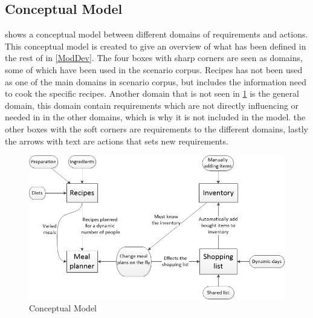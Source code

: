 \subsection{Conceptual Model} \label{ConsMod}
 shows a conceptual model between different domains of requirements and actions. This conceptual model is created to give an overview of what has been defined in the rest of  in \cref{ModDev}. The four boxes with sharp corners are seen as domains, some of which have been used in the scenario corpus. Recipes has not been used as one of the main domains in scenario corpus, but includes the information need to cook the specific recipes. Another domain that is not seen in \cref{ConceptualModelPicture} is the general domain, this domain contain requirements which are not directly influencing or needed in in the other domains, which is why it is not included in the model. the other boxes with the soft corners are requirements to the different domains, lastly the arrows with text are actions that sets new requirements.

\begin{figure}[H]
	\centering
    \includegraphics[width=1\textwidth]{Grafik/conceptualModel}
	\caption{Conceptual Model}
	\label{ConceptualModelPicture}
\end{figure}